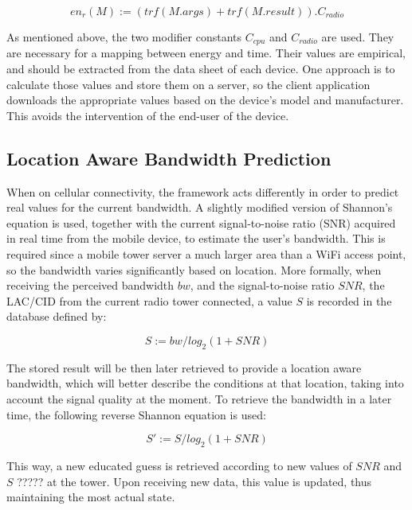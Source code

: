 \documentclass[10pt, conference, letterpaper]{IEEEtran}
\begin{document}
  \begin{equation} \label{eq:energyremote}
    en_{r}(M) := (trf(M.args) + trf(M.result)) . C_{radio}
  \end{equation}

  As mentioned above, the two modifier constants $C_{cpu}$ and $C_{radio}$ are used. They are necessary for a mapping between energy and time. Their values are empirical, and should be extracted from the data sheet of each device. One approach is to calculate those values and store them on a server, so the client application downloads the appropriate values based on the device's model and manufacturer. This avoids the intervention of the end-user of the device.

\subsection{Location Aware Bandwidth Prediction}

  When on cellular connectivity, the framework acts differently in order to predict real values for the current bandwidth. A slightly modified version of Shannon's equation is used, together with the current signal-to-noise ratio (SNR) acquired in real time from the mobile device, to estimate the user's bandwidth. This is required since a mobile tower server a much larger area than a WiFi access point, so the bandwidth varies significantly based on location. More formally, when receiving the perceived bandwidth $bw$, and the signal-to-noise ratio $SNR$, the LAC/CID from the current radio tower connected, a value $S$ is recorded in the database defined by:

  \begin{equation} \label{eq:shannonbw}
    S := bw / log_2(1 + SNR)
  \end{equation}

  The stored result will be then later retrieved to provide a location aware bandwidth, which will better describe the conditions at that location, taking into account the signal quality at the moment. To retrieve the bandwidth in a later time, the following reverse Shannon equation is used:

  \begin{equation} \label{eq:shannonbw_reverse}
    S' := S / log_2(1 + SNR)
  \end{equation}

  This way, a new educated guess is retrieved according to new values of $SNR$ {\color{red} and $S$ ?????} at the tower. Upon receiving new data, this value is updated, thus maintaining the most actual state.
  
\end{document}
